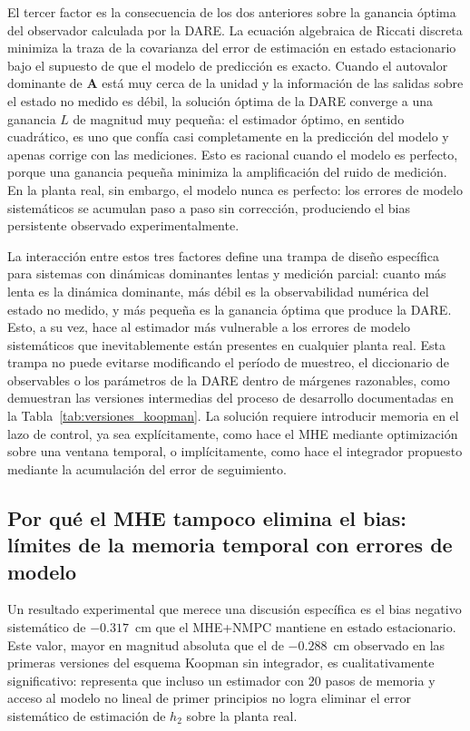 \documentclass[12pt,letterpaper]{article}
\begin{document}
El tercer factor es la consecuencia de los dos anteriores sobre 
la ganancia óptima del observador calculada por la DARE. La 
ecuación algebraica de Riccati discreta minimiza la traza de la 
covarianza del error de estimación en estado estacionario bajo el 
supuesto de que el modelo de predicción es exacto. Cuando el 
autovalor dominante de $\mathbf{A}$ está muy cerca de la unidad 
y la información de las salidas sobre el estado no medido es 
débil, la solución óptima de la DARE converge a una ganancia $L$ 
de magnitud muy pequeña: el estimador óptimo, en sentido cuadrático, 
es uno que confía casi completamente en la predicción del modelo 
y apenas corrige con las mediciones. Esto es racional cuando el 
modelo es perfecto, porque una ganancia pequeña minimiza la 
amplificación del ruido de medición. En la planta real, sin 
embargo, el modelo nunca es perfecto: los errores de modelo 
sistemáticos se acumulan paso a paso sin corrección, produciendo 
el bias persistente observado experimentalmente.

La interacción entre estos tres factores define una trampa de 
diseño específica para sistemas con dinámicas dominantes lentas 
y medición parcial: cuanto más lenta es la dinámica dominante, 
más débil es la observabilidad numérica del estado no medido, y
más pequeña es la ganancia óptima que produce la DARE. Esto, a
su vez, hace al estimador más vulnerable a los errores de modelo
sistemáticos que inevitablemente están presentes en cualquier
planta real. Esta trampa no puede evitarse modificando el período
de muestreo, el diccionario de observables o los parámetros de 
la DARE dentro de márgenes razonables, como demuestran las 
versiones intermedias del proceso de desarrollo documentadas en 
la Tabla~\ref{tab:versiones_koopman}. La solución requiere 
introducir memoria en el lazo de control, ya sea explícitamente,
como hace el MHE mediante optimización sobre una ventana
temporal, o implícitamente, como hace el integrador propuesto
mediante la acumulación del error de seguimiento.

\subsection{Por qué el MHE tampoco elimina el bias: límites de 
la memoria temporal con errores de modelo}
\label{sec:discusion_mhe_bias}

Un resultado experimental que merece una discusión específica es 
el bias negativo sistemático de $-0.317$~cm que el MHE+NMPC 
mantiene en estado estacionario. Este valor, mayor en 
magnitud absoluta que el de $-0.288$~cm observado en las primeras 
versiones del esquema Koopman sin integrador, es cualitativamente 
significativo: representa que incluso un estimador con $20$ pasos 
de memoria y acceso al modelo no lineal de primer principios no 
logra eliminar el error sistemático de estimación de $h_2$ sobre 
la planta real.
\end{document}
